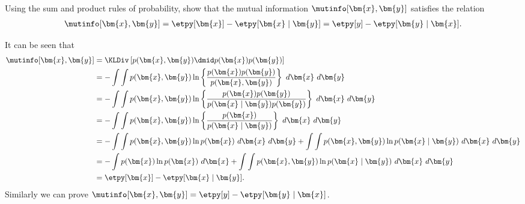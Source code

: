 \begin{question}{1.41}
	Using the sum and product rules of probability, show that the mutual information $\mutinfo[\bm{x}, \bm{y}]$ satisfies the relation
	\begin{align*}
		\mutinfo[\bm{x}, \bm{y}] = \etpy[\bm{x}] - \etpy[\bm{x} \mid \bm{y}] = \etpy[y] - \etpy[\bm{y} \mid \bm{x}].
	\end{align*}
\end{question}

\begin{answer}{}
	It can be seen that
	\begin{align}
		\mutinfo[\bm{x}, \bm{y}] &= \KLDiv\left[ p(\bm{x}, \bm{y}) \dmid p(\bm{x}) p(\bm{y})\right]\\
		&= -\int \int p(\bm{x}, \bm{y}) \ln \left\{ \frac{p(\bm{x}) p(\bm{y})}{p(\bm{x}, \bm{y})} \right\}\ d\bm{x}\ d\bm{y}\\
		&= -\int \int p(\bm{x}, \bm{y}) \ln \left\{ \frac{p(\bm{x}) p(\bm{y})}{p(\bm{x} \mid \bm{y})p(\bm{y})} \right\}\ d\bm{x}\ d\bm{y}\\
		&= -\int \int p(\bm{x}, \bm{y}) \ln \left\{ \frac{p(\bm{x})}{p(\bm{x} \mid \bm{y})} \right\}\ d\bm{x}\ d\bm{y}\\
		&= -\int \int p(\bm{x}, \bm{y}) \ln p(\bm{x})\ d\bm{x}\ d\bm{y} + \int \int p(\bm{x}, \bm{y}) \ln p(\bm{x} \mid \bm{y}) \ d\bm{x}\ d\bm{y}\\
		&= -\int p(\bm{x}) \ln p(\bm{x})\ d\bm{x} + \int \int p(\bm{x}, \bm{y}) \ln p(\bm{x} \mid \bm{y}) \ d\bm{x}\ d\bm{y}\\
		&= \etpy[\bm{x}] - \etpy[\bm{x} \mid \bm{y}].
	\end{align}
	Similarly we can prove $\mutinfo[\bm{x}, \bm{y}] = \etpy[y] - \etpy[\bm{y} \mid \bm{x}]$.
\end{answer}
